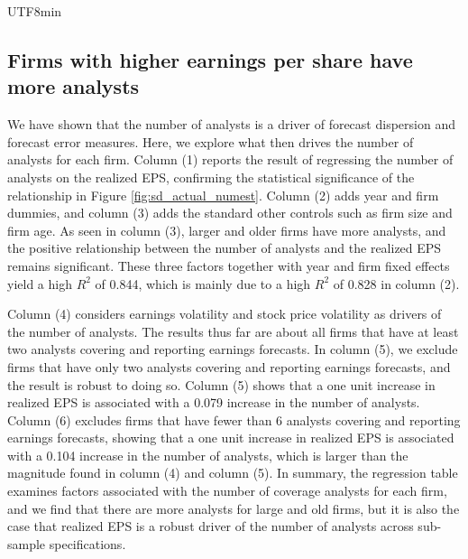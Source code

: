 \documentclass[12pt, a4paper]{article}
\begin{document}
\begin{CJK}{UTF8}{min}
\subsection{Firms with higher earnings per share have more analysts}

We have shown that the number of analysts is a driver of forecast dispersion and forecast error measures.
Here, we explore what then drives the number of analysts for each firm.
Column (1) reports the result of regressing the number of analysts on the realized EPS, confirming the statistical significance of the relationship in Figure \ref{fig:sd_actual_numest}.
Column (2) adds year and firm dummies, and column (3) adds the standard other controls such as firm size and firm age.
As seen in column (3), larger and older firms have more analysts, and the positive relationship between the number of analysts and the realized EPS remains significant.
These three factors together with year and firm fixed effects yield a high $R^2$ of 0.844, which is mainly due to a high $R^2$ of 0.828 in column (2).

\begin{table}[htbp]
\centering
\resizebox{1.0\textwidth}{!}{
\begin{threeparttable}

\begin{tablenotes}
\footnotesize
\end{tablenotes}
\end{threeparttable}
}
\caption{Regression Results for Number of Estimators}
\label{tab:reg_numest}
\end{table}


Column (4) considers earnings volatility and stock price volatility as drivers of the number of analysts.
The results thus far are about all firms that have at least two analysts covering and reporting earnings forecasts.
In column (5), we exclude firms that have only two analysts covering and reporting earnings forecasts, and the result is robust to doing so.
Column (5) shows that a one unit increase in realized EPS is associated with a 0.079 increase in the number of analysts.
Column (6) excludes firms that have fewer than 6 analysts covering and reporting earnings forecasts, showing that a one unit increase in realized EPS is associated with a 0.104 increase in the number of analysts, which is larger than the magnitude found in column (4) and column (5).
In summary, the regression table examines factors associated with the number of coverage analysts for each firm, and we find that there are more analysts for large and old firms, but it is also the case that realized EPS is a robust driver of the number of analysts across sub-sample specifications.




\end{CJK}
\end{document}
